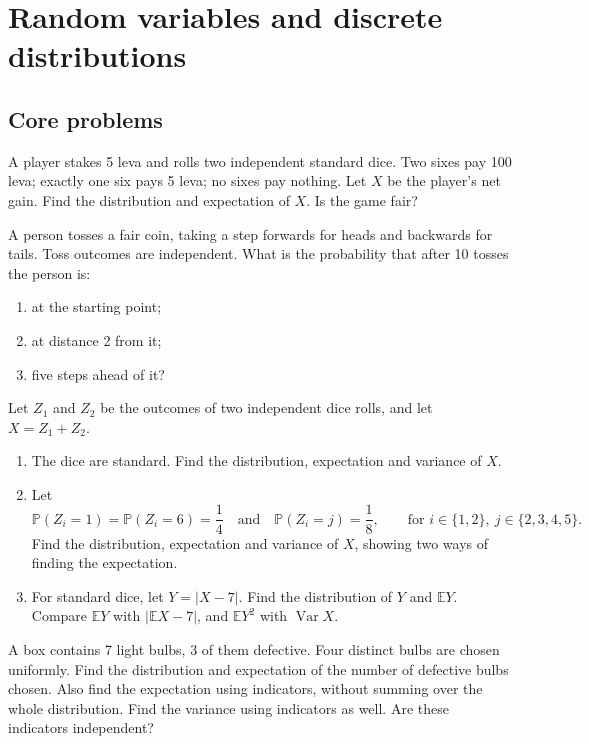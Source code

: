 \documentclass[11pt,a4paper]{article}
\newenvironment{enumeratea}{\begin{enumerate}[label=(\alph*),itemsep=0.28em,topsep=0.25em]}{\end{enumerate}}
\newcommand{\Pbb}{\mathbb P}
\newcommand{\Ebb}{\mathbb E}
\newcommand{\Var}{\operatorname{Var}}
\newcounter{problem}[section]
\begin{document}
\section{Random variables and discrete distributions}
\subsection*{Core problems}
\begin{problembook}
A player stakes 5 leva and rolls two independent standard dice. Two sixes pay
100 leva; exactly one six pays 5 leva; no sixes pay nothing. Let $X$ be the player's
net gain. Find the distribution and expectation of $X$. Is the game fair?
\end{problembook}
\begin{problembook}
A person tosses a fair coin, taking a step forwards for heads and backwards for
tails. Toss outcomes are independent. What is the probability that after 10 tosses the person is:
\begin{enumeratea}
  \item at the starting point;
  \item at distance 2 from it;
  \item five steps ahead of it?
\end{enumeratea}
\end{problembook}
\begin{problembook}
Let $Z_1$ and $Z_2$ be the outcomes of two independent dice rolls, and let $X=Z_1+Z_2$.
\begin{enumeratea}
  \item The dice are standard. Find the distribution, expectation and variance of $X$.
  \item Let
  \[
  \Pbb(Z_i=1)=\Pbb(Z_i=6)=\frac14
  \quad\text{and}\quad\Pbb(Z_i=j)=\frac18,
  \qquad\text{for }i\in\{1,2\},\ j\in\{2,3,4,5\}.
  \]
  Find the distribution, expectation and variance of $X$, showing two ways of finding the expectation.
  \item For standard dice, let $Y=|X-7|$. Find the distribution of $Y$ and $\Ebb Y$.
  Compare $\Ebb Y$ with $|\Ebb X-7|$, and $\Ebb Y^2$ with $\Var X$.
\end{enumeratea}
\end{problembook}
\begin{problem}
A box contains 7 light bulbs, 3 of them defective. Four distinct bulbs are chosen
uniformly. Find the distribution and expectation of the number of defective bulbs
chosen. Also find the expectation using indicators, without summing over the whole
distribution. Find the variance using indicators as well. Are these indicators independent?
\end{problem}
\end{document}

